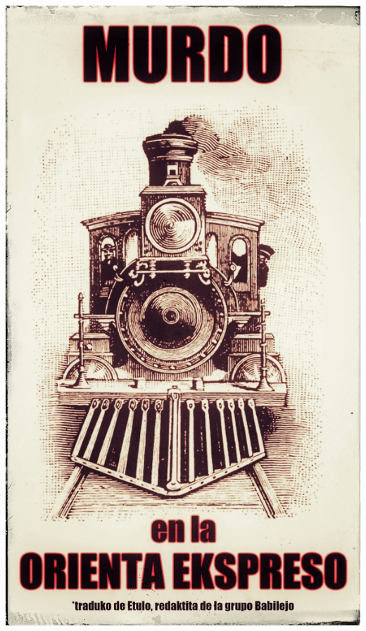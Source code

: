 
\def\mytitle{Murdo en la Orienta Ekspreso}
\def\myauthor{Agatha Christie}
\def\mycopyright{Copyright 2021, Agatha Christie. All rights reserved.}



    \begin{center}

    \includegraphics[width=\textwidth,height=\textheight]{cover.jpg} 
	\end{center}
\thispagestyle{empty}
\clearpage
\vspace*{-4em}
\tableofcontents*
\thispagestyle{empty}
\mainmatter
\setcounter{page}{3}

